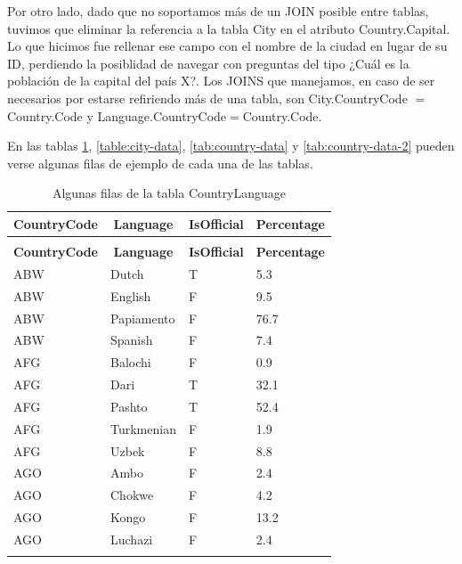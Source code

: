 Por otro lado, dado que no soportamos más de un JOIN posible entre tablas, tuvimos que eliminar la referencia a la tabla City en el atributo Country.Capital. Lo que hicimos fue rellenar ese campo con el nombre de la ciudad en lugar de su  ID, perdiendo la posiblidad de navegar con preguntas del tipo ¿Cuál es la población de la capital del país X?.
Los JOINS que manejamos, en caso de ser necesarios por estarse refiriendo más de una tabla, son City.CountryCode $=$ Country.Code y Language.CountryCode$=$Country.Code.

En las tablas \ref{table:countrylanguage-data}, \ref{table:city-data}, \ref{tab:country-data} y \ref{tab:country-data-2} pueden verse algunas filas de ejemplo de cada una de las tablas.


 \begin{longtable}{|l|l|l|l|}
 \hline  \multicolumn{1}{|c|}{\textbf{CountryCode}} & \multicolumn{1}{|c|}{\textbf{Language}} & \multicolumn{1}{|c|}{\textbf{IsOfficial}} & \multicolumn{1}{|c|}{\textbf{Percentage}} \\ \hline  \endfirsthead
\caption{Algunas filas de la tabla CountryLanguage (cont)} \\ \hline \multicolumn{1}{|c|}{\textbf{CountryCode}} & \multicolumn{1}{|c|}{\textbf{Language}} & \multicolumn{1}{|c|}{\textbf{IsOfficial}} & \multicolumn{1}{|c|}{\textbf{Percentage}} \\ \hline \hline \endhead \endfoot
ABW & Dutch & T & 5.3 \\ \hline
ABW & English & F & 9.5 \\ \hline
ABW & Papiamento & F & 76.7 \\ \hline
ABW & Spanish & F & 7.4 \\ \hline
AFG & Balochi & F & 0.9 \\ \hline
AFG & Dari & T & 32.1 \\ \hline
AFG & Pashto & T & 52.4 \\ \hline
AFG & Turkmenian & F & 1.9 \\ \hline
AFG & Uzbek & F & 8.8 \\ \hline
AGO & Ambo & F & 2.4 \\ \hline
AGO & Chokwe & F & 4.2 \\ \hline
AGO & Kongo & F & 13.2 \\ \hline
AGO & Luchazi & F & 2.4 \\ \hline
\caption{Algunas filas de la tabla CountryLanguage}
\label{table:countrylanguage-data}
\end{longtable}




